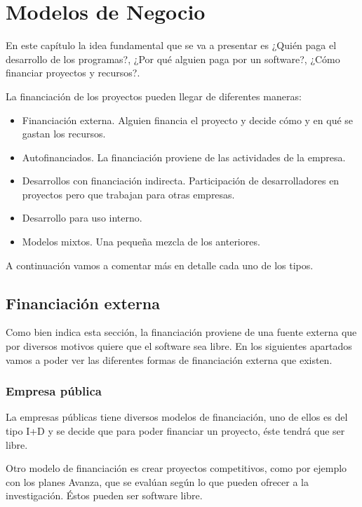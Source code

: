 \chapter{Modelos de Negocio}
\label{CHAP3:Economy}

En este capítulo la idea fundamental que se va a presentar es ¿Quién paga el
desarrollo de los programas?, ¿Por qué alguien paga por un software?, ¿Cómo
financiar proyectos y recursos?.


La financiación de los proyectos pueden llegar de diferentes maneras:

\begin{itemize}
  \item Financiación externa. Alguien financia el proyecto y decide cómo y en
  qué se gastan los recursos.
  \item Autofinanciados. La financiación proviene de las actividades de la
  empresa.
  \item Desarrollos con financiación indirecta. Participación de desarrolladores
  en proyectos pero que trabajan para otras empresas.
  \item Desarrollo para uso interno.
  \item Modelos mixtos. Una pequeña mezcla de los anteriores.
\end{itemize}

A continuación vamos a comentar más en detalle cada uno de los tipos.


\section{Financiación externa}

Como bien indica esta sección, la financiación proviene de una fuente externa
que por diversos motivos quiere que el software sea libre. En los siguientes
apartados vamos a poder ver las diferentes formas de financiación externa que
existen.

\subsection{Empresa pública}


La empresas públicas tiene diversos modelos de financiación, uno de ellos es
del tipo I+D y se decide que para poder financiar un proyecto, éste tendrá que
ser libre.

Otro modelo de financiación es crear proyectos competitivos, como por ejemplo
con los planes Avanza, que se evalúan según lo que pueden ofrecer a la
investigación. Éstos pueden ser software libre.

